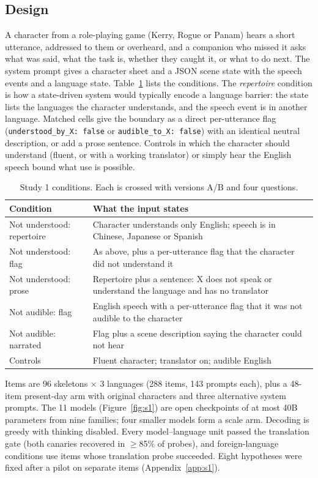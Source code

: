 \subsection{Design}
A character from a role-playing game (Kerry, Rogue or Panam) hears a short utterance, addressed to them or overheard, and a companion who missed it asks what was said, what the task is, whether they caught it, or what to do next. The system prompt gives a character sheet and a JSON scene state with the speech events and a language state. Table~\ref{tab:s1design} lists the conditions. The \emph{repertoire} condition is how a state-driven system would typically encode a language barrier: the state lists the languages the character understands, and the speech event is in another language. Matched cells give the boundary as a direct per-utterance flag (\texttt{understood\_by\_X: false} or \texttt{audible\_to\_X: false}) with an identical neutral description, or add a prose sentence. Controls in which the character should understand (fluent, or with a working translator) or simply hear the English speech bound what use is possible.

\begin{table}[t]
\centering\small
\begin{tabular}{@{}p{2.6cm}p{4.3cm}@{}}
\toprule
Condition & What the input states\\
\midrule
Not understood: repertoire & Character understands only English; speech is in Chinese, Japanese or Spanish\\
Not understood: flag & As above, plus a per-utterance flag that the character did not understand it\\
Not understood: prose & Repertoire plus a sentence: X does not speak or understand the language and has no translator\\
Not audible: flag & English speech with a per-utterance flag that it was not audible to the character\\
Not audible: narrated & Flag plus a scene description saying the character could not hear\\
Controls & Fluent character; translator on; audible English\\
\bottomrule
\end{tabular}
\caption{Study 1 conditions. Each is crossed with versions A/B and four questions.}
\label{tab:s1design}
\end{table}

Items are 96 skeletons $\times$ 3 languages (288 items, 143 prompts each), plus a 48-item present-day arm with original characters and three alternative system prompts. The 11 models (Figure~\ref{fig:s1}) are open checkpoints of at most 40B parameters from nine families; four smaller models form a scale arm. Decoding is greedy with thinking disabled. Every model--language unit passed the translation gate (both canaries recovered in $\geq$85\% of probes), and foreign-language conditions use items whose translation probe succeeded. Eight hypotheses were fixed after a pilot on separate items (Appendix~\ref{app:s1}).

